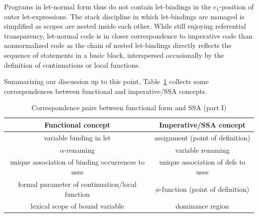 Programs in let-normal form thus do not contain let-bindings in the
$e_1$-position of outer let-expressions. The stack discipline in which
let-bindings are managed is simplified as scopes are nested inside
each other.
While still enjoying referential transparency, let-normal code is in
closer correspondence to imperative code than nonnormalized code as
the chain of nested let-bindings directly reflects the sequence of
statements in a basic block, interspersed occasionally by the
definition of continuations or local functions.




Summarizing our discussion up to this point,
Table~\ref{tableFunctionalCorrespondencesZero} collects some
correspondences between functional and imperative/SSA concepts.
\begin{table}
\begin{center}
\begin{tabular}{|c|c|}
  \hline Functional concept & Imperative/SSA concept\\ 
  \hline \hline
  variable binding in let & assignment (point of definition)\\
  $\alpha$-renaming & variable renaming\\
  unique association of binding occurrences to uses & unique
  association of defs to uses\\ 
  formal parameter of continuation/local function & 
    $\phi$-function (point of definition)\\ 
  lexical scope of bound variable & dominance region\\ 
  \hline
\end{tabular}
\end{center}
\caption{\label{tableFunctionalCorrespondencesZero}
  Correspondence pairs between functional form and SSA (part I)}
\end{table}

